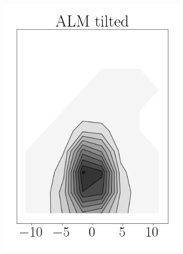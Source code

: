 \begin{figure}[h!]
\begin{subfigure}[b]{0.2\textwidth}
   \includegraphics[scale=0.4]{./part2_developments/figures_ch6_lagrangian_JICF/params_gaseous_initial_conditions/maps/ALM_FDC_0p10_flux}
\end{subfigure}
\hspace*{0.00in}
\begin{subfigure}[b]{0.2\textwidth}
	\flushleft

\end{subfigure}
\end{figure}
